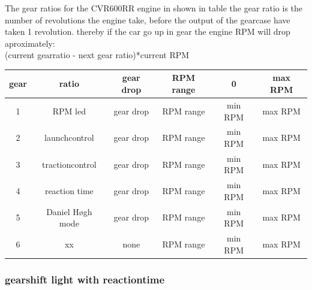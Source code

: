 The gear ratios for the CVR600RR engine in shown in table %
the gear ratio is the number of revolutions the engine take, before the output of the gearcase have taken 1 revolution.
thereby if the car go up in gear the engine RPM will drop aproximately: \\ \hline (current gearratio - next gear ratio)*current RPM  \\ \hline 

\begin{center}
\footnotesize
  \begin{tabular}{| c | c | c | c | c | c |}
    \hline
    gear  & ratio  & gear drop & RPM range & 0 & max RPM \\ \hline
    1     & RPM led & gear drop & RPM range & min RPM & max RPM            \\ \hline
    2 & launchcontrol & gear drop & RPM range & min RPM & max RPM       \\ \hline
    3 & tractioncontrol & gear drop & RPM range & min RPM & max RPM    \\ \hline
    4 & reaction time & gear drop & RPM range & min RPM & max RPM      \\ \hline
    5 & Daniel Høgh mode & gear drop & RPM range & min RPM & max RPM   \\ \hline
    6 & xx & none & RPM range & min RPM & max RPM                 \\ \hline
  \end{tabular}
\label{tab:gear_ratio}
\end{center}


\subsubsection*{gearshift light with reactiontime} 
